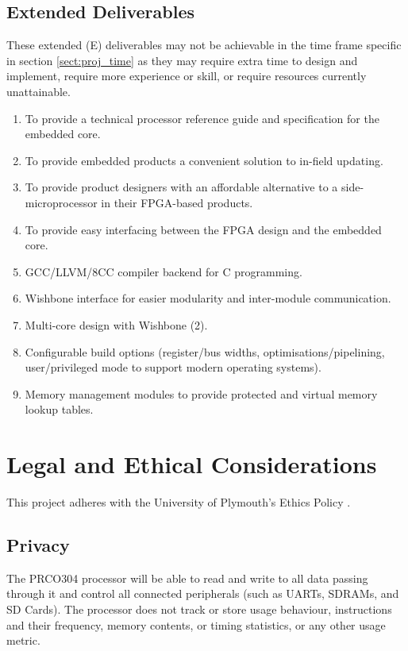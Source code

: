 \documentclass[11pt,a4paper]{report}
\newcommand{\scname}{PRCO304}
\begin{document}
\subsection{Extended Deliverables}
These extended (E) deliverables may not be achievable in the time frame specific in section \ref{sect:proj_time} as they may require extra time to design and implement, require more experience or skill, or require resources currently unattainable.
\begin{enumerate}[label=\bfseries E\arabic*.]
\item{To provide a technical processor reference guide and specification for the embedded core.}
\item{To provide embedded products a convenient solution to in-field updating.}
\item{To provide product designers with an affordable alternative to a side-microprocessor in their FPGA-based products.}
\item{To provide easy interfacing between the FPGA design and the embedded core.}
\item{GCC/LLVM/8CC compiler backend for C programming.}\label{sect:deliv:ed:gcc}
\item{Wishbone interface for easier modularity and inter-module communication.}
\item{Multi-core design with Wishbone (2).}
\item{Configurable build options (register/bus widths, optimisations/pipelining, user/privileged mode to support modern operating systems).}
\item{Memory management modules to provide protected and virtual memory lookup tables.}
\end{enumerate}


\section{Legal and Ethical Considerations}
This project adheres with the University of Plymouth's Ethics Policy \cite{ethics}.

\subsection{Privacy}
The \scname{} processor will be able to read and write to all data passing through it and control all connected peripherals (such as UARTs, SDRAMs, and SD Cards). The processor does not track or store usage behaviour, instructions and their frequency,   memory contents, or timing statistics, or any other usage metric.
\end{document}
